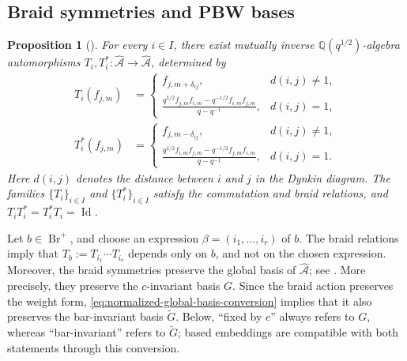 \documentclass[12pt, reqno]{amsart}
\theoremstyle{plain}
\newtheorem{proposition}[theorem]{Proposition}
\theoremstyle{definition}
\numberwithin{equation}{section}
\newcommand{\QQ}{\mathbb{Q}}
\newcommand{\Id}{\operatorname{Id}}
\newcommand{\cA}{\mathcal{A}}
\newcommand{\Br}{{\operatorname{Br}}}
\begin{document}
\subsection{Braid symmetries and PBW bases}

\begin{proposition}[{\cite{kashiwara2021braid}}]
    \label{pro:braidsym}
    For every \(i\in I\), there exist mutually inverse
    \(\QQ(q^{1/2})\)-algebra automorphisms
    \(T_i,T_i^*\colon\widehat{\cA}\to\widehat{\cA}\), determined by
    \begin{align}
        T_i(f_{j,m})
        &=
        \begin{cases}
            f_{j,m+\delta_{ij}}, & d(i,j)\neq1,\\[1mm]
            \displaystyle
            \frac{q^{1/2}f_{j,m}f_{i,m}
                  -q^{-1/2}f_{i,m}f_{j,m}}{q-q^{-1}},
                & d(i,j)=1,
        \end{cases}
        \label{eq:braid-symmetry-T}\\
        T_i^*(f_{j,m})
        &=
        \begin{cases}
            f_{j,m-\delta_{ij}}, & d(i,j)\neq1,\\[1mm]
            \displaystyle
            \frac{q^{1/2}f_{i,m}f_{j,m}
                  -q^{-1/2}f_{j,m}f_{i,m}}{q-q^{-1}},
                & d(i,j)=1.
        \end{cases}
        \label{eq:braid-symmetry-T-star}
    \end{align}
    Here \(d(i,j)\) denotes the distance between \(i\) and \(j\) in
    the Dynkin diagram. The families \(\{T_i\}_{i\in I}\) and
    \(\{T_i^*\}_{i\in I}\) satisfy the commutation and braid relations,
    and \(T_iT_i^*=T_i^*T_i=\Id\).
\end{proposition}

Let \(b\in\Br^+\), and choose an expression
\(\beta=(i_1,\ldots,i_r)\) of \(b\). The braid relations imply that
\(T_b:=T_{i_1}\cdots T_{i_r}\) depends only on \(b\), and not on the
chosen expression. Moreover, the braid symmetries preserve the global
basis of \(\widehat{\cA}\); see
\cite[Theorem~3.7]{kashiwara2024braid}. More precisely, they preserve
the \(c\)-invariant basis \(G\). Since the braid action preserves the
weight form, \eqref{eq:normalized-global-basis-conversion} implies
that it also preserves the bar-invariant basis \(\widetilde G\).
Below, ``fixed by \(c\)'' always refers to \(G\), whereas
``bar-invariant'' refers to \(\widetilde G\); based embeddings are
compatible with both statements through this conversion.
\end{document}
